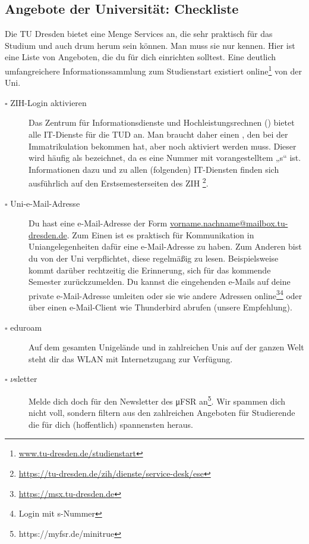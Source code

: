 \documentclass{scrartcl}
\begin{document}
\begin{description}
\section*{Angebote der Universität: Checkliste}
\label{sec:angebote_der_universitat}
Die TU Dresden bietet eine Menge Services an, die sehr praktisch für das Studium und auch drum herum sein können.
Man muss sie nur kennen. Hier ist eine Liste von Angeboten, die du für dich einrichten solltest.
Eine deutlich umfangreichere Informationssammlung zum Studienstart
existiert online\footnote{\url{www.tu-dresden.de/studienstart}} von der Uni.
\newcommand{\clitem}[1]{\item[$\square$ #1]}
\begin{description}
  \clitem{ZIH-Login aktivieren} Das Zentrum für Informationsdienste und Hochleistungsrechnen ()
    bietet alle IT-Dienste für die TUD an. Man braucht daher einen , den bei der
    Immatrikulation bekommen hat, aber noch aktiviert werden muss.
    Dieser wird häufig als  bezeichnet, da es eine Nummer mit vorangestelltem „s“ ist.
    Informationen dazu und zu allen (folgenden) IT-Diensten finden sich ausführlich auf den
    Erstsemesterseiten des ZIH \footnote{\url{https://tu-dresden.de/zih/dienste/service-desk/ese}\label{zihurl}}.
  \clitem{Uni-e-Mail-Adresse} Du hast eine e-Mail-Adresse der Form \url{vorname.nachname@mailbox.tu-dresden.de}.
    Zum Einen ist es praktisch für Kommunikation in Uniangelegenheiten dafür eine e-Mail-Adresse zu haben.
    Zum Anderen bist du von der Uni verpflichtet, diese regelmäßig zu lesen.
    Beispielsweise kommt darüber rechtzeitig die Erinnerung, sich für das kommende Semester zurückzumelden.
    Du kannst die eingehenden e-Mails auf deine private e-Mail-Adresse umleiten oder sie wie andere Adressen
    online\footnote{\url{https://msx.tu-dresden.de}}\footnote{Login mit s-Nummer\label{snr}} oder über einen e-Mail-Client wie Thunderbird abrufen (unsere Empfehlung).
  \clitem{eduroam} Auf dem gesamten Unigelände und in zahlreichen Unis auf der ganzen Welt steht dir
    das WLAN  mit Internetzugang zur Verfügung.
  \clitem{$\nu$sletter} Melde dich doch für den Newsletter des μFSR an\footnote{https://myfsr.de/minitrue}.
    Wir spammen dich nicht voll, sondern
    filtern aus den zahlreichen Angeboten für Studierende die für dich (hoffentlich) spannensten heraus.

\end{description}
\end{description}
\end{document}

